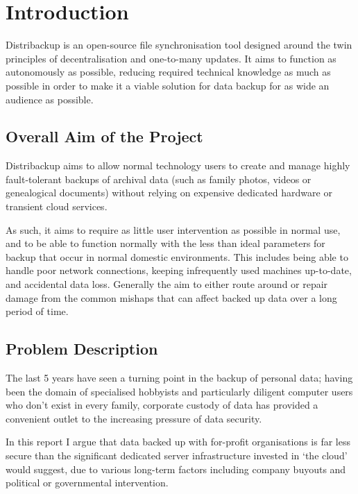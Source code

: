 \documentclass[12pt,a4paper,]{adreport}
\author{}
\date{}
\begin{document}
{
\hypersetup{linkcolor=black}
\setcounter{tocdepth}{2}
\tableofcontents
}
\chapter{Introduction}\label{introduction}

Distribackup is an open-source file synchronisation tool designed around
the twin principles of decentralisation and one-to-many updates. It aims
to function as autonomously as possible, reducing required technical
knowledge as much as possible in order to make it a viable solution for
data backup for as wide an audience as possible.

\section{Overall Aim of the Project}\label{overall-aim-of-the-project}

Distribackup aims to allow normal technology users to create and manage
highly fault-tolerant backups of archival data (such as family photos,
videos or genealogical documents) without relying on expensive dedicated
hardware or transient cloud services.

As such, it aims to require as little user intervention as possible in
normal use, and to be able to function normally with the less than ideal
parameters for backup that occur in normal domestic environments. This
includes being able to handle poor network connections, keeping
infrequently used machines up-to-date, and accidental data loss.
Generally the aim to either route around or repair damage from the
common mishaps that can affect backed up data over a long period of
time.

\section{Problem Description}\label{problem-description}

The last 5 years have seen a turning point in the backup of personal
data; having been the domain of specialised hobbyists and particularly
diligent computer users who don't exist in every family, corporate
custody of data has provided a convenient outlet to the increasing
pressure of data security.

In this report I argue that data backed up with for-profit organisations
is far less secure than the significant dedicated server infrastructure
invested in `the cloud' would suggest, due to various long-term factors
including company buyouts and political or governmental intervention.
\end{document}
